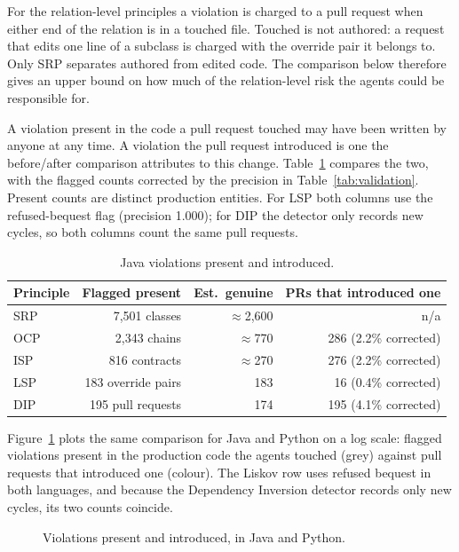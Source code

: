 For the relation-level principles a violation is charged to a pull request when either end of the
relation is in a touched file. Touched is not authored: a request that edits one line of a subclass
is charged with the override pair it belongs to. Only SRP separates authored from edited code. The
comparison below therefore gives an upper bound on how much of the relation-level risk the agents
could be responsible for.

A violation present in the code a pull request touched may have been written by anyone at any time.
A violation the pull request introduced is one the before/after comparison attributes to this
change. Table~\ref{tab:present-introduced} compares the two, with the flagged counts corrected by the
precision in Table~\ref{tab:validation}. Present counts are distinct production entities. For
LSP both columns use the refused-bequest flag (precision 1.000); for DIP the detector only records new
cycles, so both columns count the same pull requests.

\begin{table}[htb]
\centering
\caption{Java violations present and introduced.}
\label{tab:present-introduced}
\begin{tabular}{@{}lrrr@{}}
\toprule
\textbf{Principle} & \textbf{Flagged present} & \textbf{Est.\ genuine} &
\textbf{PRs that introduced one} \\
\midrule
SRP & 7{,}501 classes & $\approx$2{,}600 & n/a \\
OCP & 2{,}343 chains & $\approx$770 & 286 (2.2\% corrected) \\
ISP & 816 contracts & $\approx$270 & 276 (2.2\% corrected) \\
LSP & 183 override pairs & 183 & 16 (0.4\% corrected) \\
DIP & 195 pull requests & 174 & 195 (4.1\% corrected) \\
\bottomrule
\end{tabular}
\end{table}

Figure~\ref{fig:present-introduced} plots the same comparison for Java and Python on a log scale:
flagged violations present in the production code the agents touched (grey) against pull requests
that introduced one (colour). The Liskov row uses refused bequest in both languages, and because the
Dependency Inversion detector records only new cycles, its two counts coincide.

\begin{figure}[htb]
\centering

\caption{Violations present and introduced, in Java and Python.}
\label{fig:present-introduced}
\end{figure}

